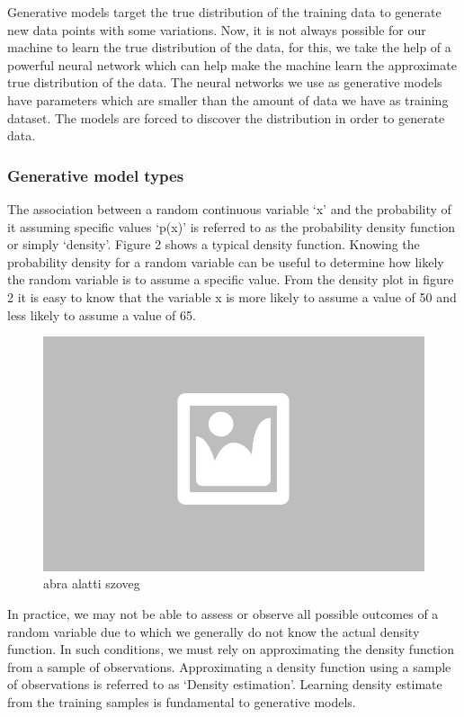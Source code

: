 Generative models target the true distribution of the training data to generate new data points with some variations. Now, it is not always possible for our machine to learn the true distribution of the data, for this, we take the help of a powerful neural network which can help make the machine learn the approximate true distribution of the data.
The neural networks we use as generative models have parameters which are smaller than the amount of data we have as training dataset. The models are forced to discover the distribution in order to generate data.

\subsubsection{Generative model types}

The association between a random continuous variable ‘x’ and the probability of it assuming specific values ‘p(x)’ is referred to as the probability density function or simply ‘density’. Figure 2 shows a typical density function. Knowing the probability density for a random variable can be useful to determine how likely the random variable is to assume a specific value. From the density plot in figure 2 it is easy to know that the variable x is more likely to assume a value of 50 and less likely to assume a value of 65.

\begin{figure}[h]
	\centering
	\includegraphics[width=0.65\columnwidth]{figures/abra.png}
	\caption{abra alatti szoveg}
\end{figure}

In practice, we may not be able to assess or observe all possible outcomes of a random variable due to which we generally do not know the actual density function. In such conditions, we must rely on approximating the density function from a sample of observations. Approximating a density function using a sample of observations is referred to as ‘Density estimation’.  Learning density estimate from the training samples is fundamental to generative models.

